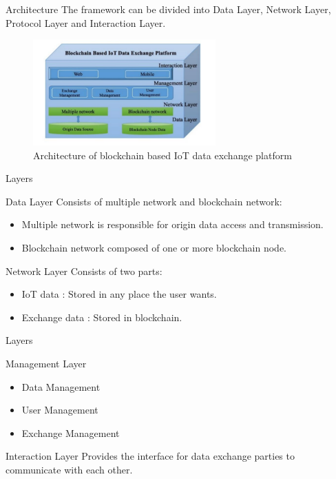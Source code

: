 \documentclass[10pt]{beamer}
\begin{document}
\begin{frame}{Architecture}
  The framework can be divided into Data Layer, Network Layer, Protocol Layer and Interaction Layer.
	\begin{figure}  
	\includegraphics[width=7cm]{architecture}    
    \caption{Architecture of blockchain based IoT data exchange platform}
    \end{figure}
\end{frame}
\begin{frame}{Layers}
	\begin{alertblock}{Data Layer}
		 Consists of multiple network and blockchain network:
			\begin{itemize}
			\item Multiple network is responsible for origin data access and transmission.
			\item Blockchain network composed of one or more blockchain node.
			\end{itemize}
	\end{alertblock}
		\begin{alertblock}{Network Layer}
		 Consists of two parts:
			\begin{itemize}
			\item IoT data : Stored in any place the user wants.
			\item Exchange data : Stored in blockchain.
			\end{itemize}
	\end{alertblock}


\end{frame}

\begin{frame}{Layers}
	\begin{alertblock}{Management Layer}
		 
			\begin{itemize}
			\item Data Management
			\item User Management
			\item Exchange Management
			\end{itemize}
	\end{alertblock}
	\begin{alertblock}{Interaction Layer}
		 Provides the interface for data exchange parties to communicate with each other.
	\end{alertblock}	 
\end{frame}
\end{document}
